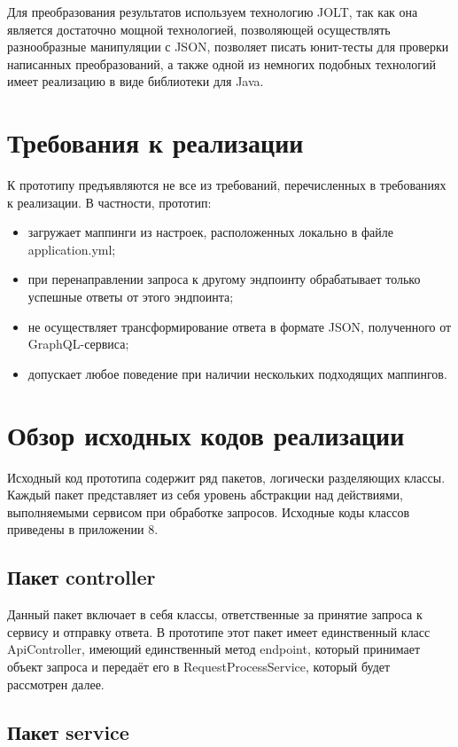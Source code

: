 Для преобразования результатов используем технологию JOLT, так как она является достаточно мощной технологией, позволяющей осуществлять разнообразные манипуляции с JSON, позволяет писать юнит-тесты для проверки написанных преобразований, а также одной из немногих подобных технологий имеет реализацию в виде библиотеки для Java.


\section{Требования к реализации}\label{ch3:sec1}

К прототипу предъявляются не все из требований, перечисленных в требованиях к реализации.
В частности, прототип:

\begin{itemize}
	\item загружает маппинги из настроек, расположенных локально в файле application.yml;
	\item при перенаправлении запроса к другому эндпоинту обрабатывает только успешные ответы от этого эндпоинта;
	\item не осуществляет трансформирование ответа в формате JSON, полученного от GraphQL-сервиса;
	\item допускает любое поведение при наличии нескольких подходящих маппингов.
\end{itemize}

\section{Обзор исходных кодов реализации}\label{ch3:sec2}

Исходный код прототипа содержит ряд пакетов, логически разделяющих классы.
Каждый пакет представляет из себя уровень абстракции над действиями, выполняемыми сервисом при обработке запросов.
Исходные коды классов приведены в приложении 8.

\subsection{Пакет controller}

Данный пакет включает в себя классы, ответственные за принятие запроса к сервису и отправку ответа.
В прототипе этот пакет имеет единственный класс ApiController, имеющий единственный метод endpoint, который принимает объект запроса и передаёт его в RequestProcessService, который будет рассмотрен далее.

\subsection{Пакет service}

